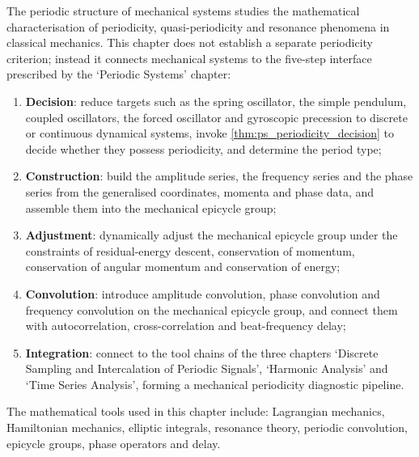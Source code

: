 \begin{remark}\label{rem:mech_five_steps_positioning}
The periodic structure of mechanical systems studies the mathematical characterisation of periodicity, quasi-periodicity and resonance phenomena in classical mechanics. This chapter does not establish a separate periodicity criterion; instead it connects mechanical systems to the five-step interface prescribed by the `Periodic Systems' chapter:
\begin{enumerate}[label=(\arabic*)]
    \item \textbf{Decision}: reduce targets such as the spring oscillator, the simple pendulum, coupled oscillators, the forced oscillator and gyroscopic precession to discrete or continuous dynamical systems, invoke \cref{thm:ps_periodicity_decision} to decide whether they possess periodicity, and determine the period type;
    \item \textbf{Construction}: build the amplitude series, the frequency series and the phase series from the generalised coordinates, momenta and phase data, and assemble them into the mechanical epicycle group;
    \item \textbf{Adjustment}: dynamically adjust the mechanical epicycle group under the constraints of residual-energy descent, conservation of momentum, conservation of angular momentum and conservation of energy;
    \item \textbf{Convolution}: introduce amplitude convolution, phase convolution and frequency convolution on the mechanical epicycle group, and connect them with autocorrelation, cross-correlation and beat-frequency delay;
    \item \textbf{Integration}: connect to the tool chains of the three chapters `Discrete Sampling and Intercalation of Periodic Signals', `Harmonic Analysis' and `Time Series Analysis', forming a mechanical periodicity diagnostic pipeline.
\end{enumerate}
The mathematical tools used in this chapter include: Lagrangian mechanics, Hamiltonian mechanics, elliptic integrals, resonance theory, periodic convolution, epicycle groups, phase operators and delay.
\end{remark}

